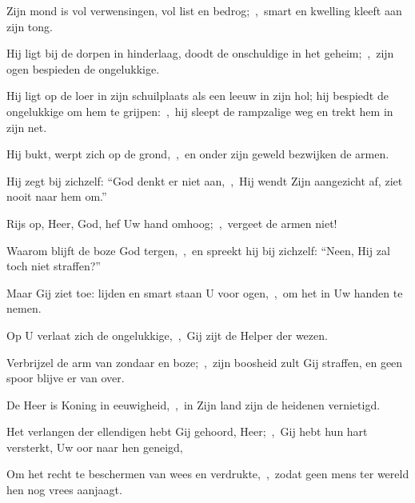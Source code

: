 \documentclass[12pt,twoside,a5paper]{article}
\begin{document}
\begin{halfparskip}
  Zijn mond is vol verwensingen, vol list en bedrog;~\sep\ smart en kwelling kleeft aan zijn tong.

  Hij ligt bij de dorpen in hinderlaag, doodt de onschuldige in het geheim;~\sep\ zijn ogen bespieden de ongelukkige.

  Hij ligt op de loer in zijn schuilplaats als een leeuw in zijn hol; hij bespiedt de ongelukkige om hem te grijpen:~\sep\ hij sleept de rampzalige weg en trekt hem in zijn net.

  Hij bukt, werpt zich op de grond,~\sep\ en onder zijn geweld bezwijken de armen.

  Hij zegt bij zichzelf: ``God denkt er niet aan,~\sep\ Hij wendt Zijn aangezicht af, ziet nooit naar hem om.''

  Rijs op, Heer, God, hef Uw hand omhoog;~\sep\ vergeet de armen niet!

  Waarom blijft de boze God tergen,~\sep\ en spreekt hij bij zichzelf: ``Neen, Hij zal toch niet straffen?''

  Maar Gij ziet toe: lijden en smart staan U voor ogen,~\sep\ om het in Uw handen te nemen.

  Op U verlaat zich de ongelukkige,~\sep\ Gij zijt de Helper der wezen.

  Verbrijzel de arm van zondaar en boze;~\sep\ zijn boosheid zult Gij straffen, en geen spoor blijve er van over.

  De Heer is Koning in eeuwigheid,~\sep\ in Zijn land zijn de heidenen vernietigd.

  Het verlangen der ellendigen hebt Gij gehoord, Heer;~\sep\ Gij hebt hun hart versterkt, Uw oor naar hen geneigd,

  Om het recht te beschermen van wees en verdrukte,~\sep\ zodat geen mens ter wereld hen nog vrees aanjaagt.
\end{halfparskip}
\end{document}
